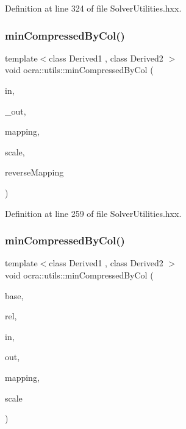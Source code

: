 Definition at line 324 of file Solver\+Utilities.\+hxx.

\hypertarget{namespaceocra_1_1utils_ab527c3744d4c3ca93750164c91a9c3dd}{}\label{namespaceocra_1_1utils_ab527c3744d4c3ca93750164c91a9c3dd} 
\subsubsection{\texorpdfstring{min\+Compressed\+By\+Col()}{minCompressedByCol()}\hspace{0.1cm}{\footnotesize\ttfamily [1/2]}}
{\footnotesize\ttfamily template$<$class Derived1 , class Derived2 $>$ \\
void ocra\+::utils\+::min\+Compressed\+By\+Col (\begin{DoxyParamCaption}\item[{const Matrix\+Base$<$ Derived1 $>$ \&}]{in,  }\item[{Matrix\+Base$<$ Derived2 $>$ const \&}]{\+\_\+out,  }\item[{const std\+::vector$<$ int $>$ \&}]{mapping,  }\item[{double}]{scale,  }\item[{bool}]{reverse\+Mapping }\end{DoxyParamCaption})\hspace{0.3cm}{\ttfamily [inline]}}



Definition at line 259 of file Solver\+Utilities.\+hxx.

\hypertarget{namespaceocra_1_1utils_aa4b4cd7a5d18ae426d5aa2fb46d20902}{}\label{namespaceocra_1_1utils_aa4b4cd7a5d18ae426d5aa2fb46d20902} 
\subsubsection{\texorpdfstring{min\+Compressed\+By\+Col()}{minCompressedByCol()}\hspace{0.1cm}{\footnotesize\ttfamily [2/2]}}
{\footnotesize\ttfamily template$<$class Derived1 , class Derived2 $>$ \\
void ocra\+::utils\+::min\+Compressed\+By\+Col (\begin{DoxyParamCaption}\item[{const \hyperlink{classocra_1_1Variable}{Variable} \&}]{base,  }\item[{const \hyperlink{classocra_1_1Variable}{Variable} \&}]{rel,  }\item[{const Matrix\+Base$<$ Derived1 $>$ \&}]{in,  }\item[{Matrix\+Base$<$ Derived2 $>$ const \&}]{out,  }\item[{std\+::vector$<$ int $>$ \&}]{mapping,  }\item[{double}]{scale }\end{DoxyParamCaption})\hspace{0.3cm}{\ttfamily [inline]}}



